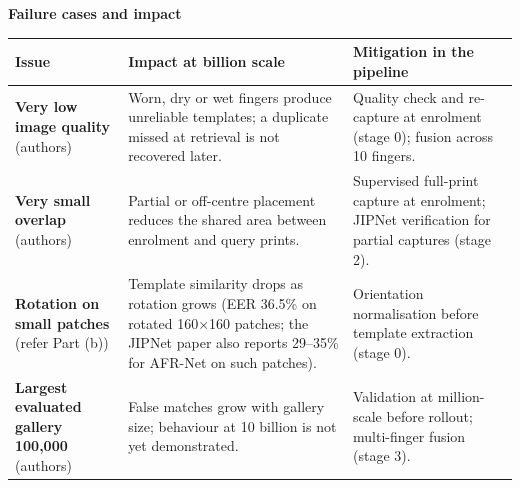 \documentclass[10pt,a4paper]{article}
\begin{document}
\textbf{Failure cases and impact}\par
\begin{tabularx}{\textwidth}{@{}>{\raggedright}p{3.4cm}>{\raggedright}X>{\raggedright\arraybackslash}X@{}}\toprule
\textbf{Issue} & \textbf{Impact at billion scale} & \textbf{Mitigation in the pipeline}\\\midrule
\textbf{Very low image quality} (authors) & Worn, dry or wet fingers produce unreliable templates; a duplicate missed at retrieval is not recovered later. & Quality check and re-capture at enrolment (stage 0); fusion across 10 fingers.\\\midrule
\textbf{Very small overlap} (authors) & Partial or off-centre placement reduces the shared area between enrolment and query prints. & Supervised full-print capture at enrolment; JIPNet verification for partial captures (stage 2).\\\midrule
\textbf{Rotation on small patches} (refer Part (b)) & Template similarity drops as rotation grows (EER 36.5\% on rotated 160$\times$160 patches; the JIPNet paper also reports 29--35\% for AFR-Net on such patches). & Orientation normalisation before template extraction (stage 0).\\\midrule
\textbf{Largest evaluated gallery 100,000} (authors) & False matches grow with gallery size; behaviour at 10 billion is not yet demonstrated. & Validation at million-scale before rollout; multi-finger fusion (stage 3).\\\bottomrule\end{tabularx}
\end{document}
